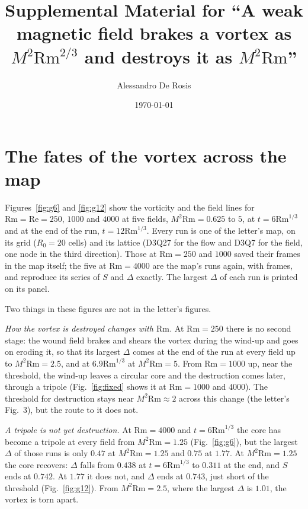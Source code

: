 \documentclass[aps,prl,onecolumn,10pt,amsmath,amssymb,superscriptaddress,floatfix]{revtex4-2}
\newcommand{\Rm}{\mathrm{Rm}}
\newcommand{\Rey}{\mathrm{Re}}
\begin{document}
\title{Supplemental Material for ``A weak magnetic field brakes a vortex as
\texorpdfstring{$M^2\Rm^{2/3}$}{M2 Rm2/3} and destroys it as
\texorpdfstring{$M^2\Rm$}{M2 Rm}''}

\author{Alessandro De Rosis}

\date{\today}
\maketitle

\section{The fates of the vortex across the map}

Figures~\ref{fig:g6} and \ref{fig:g12} show the vorticity and the field lines for
$\Rm=\Rey=250$, $1000$ and $4000$ at five fields, $M^2\Rm=0.625$ to $5$, at
$t=6\Rm^{1/3}$ and at the end of the run, $t=12\Rm^{1/3}$. Every run is one of the
letter's map, on its grid ($R_0=20$ cells) and its lattice (D3Q27 for the flow and
D3Q7 for the field, one node in the third direction). Those at $\Rm=250$ and
$1000$ saved their frames in the map itself; the five at $\Rm=4000$ are the map's
runs again, with frames, and reproduce its series of $S$ and $\Delta$ exactly.
The largest $\Delta$ of each run is printed on its panel.

Two things in these figures are not in the letter's figures.

\textit{How the vortex is destroyed changes with $\Rm$.} At $\Rm=250$ there is no
second stage: the wound field brakes and shears the vortex during the wind-up and
goes on eroding it, so that its largest $\Delta$ comes at the end of the run at every
field up to $M^2\Rm=2.5$, and at $6.9\Rm^{1/3}$ at $M^2\Rm=5$. From $\Rm=1000$ up,
near the threshold, the wind-up leaves a circular core and the destruction comes
later, through a tripole (Fig.~\ref{fig:fixed} shows it at $\Rm=1000$ and $4000$). The threshold for destruction stays near $M^2\Rm\approx2$ across this change
(the letter's Fig.~3), but the route to it does not.

\textit{A tripole is not yet destruction.} At $\Rm=4000$ and $t=6\Rm^{1/3}$ the core
has become a tripole at every field from $M^2\Rm=1.25$ (Fig.~\ref{fig:g6}), but the
largest $\Delta$ of those runs is only $0.47$ at $M^2\Rm=1.25$ and $0.75$ at $1.77$.
At $M^2\Rm=1.25$ the core recovers: $\Delta$ falls from $0.438$ at $t=6\Rm^{1/3}$ to
$0.311$ at the end, and $S$ ends at $0.742$. At $1.77$ it does not, and $\Delta$
ends at $0.743$, just short of the threshold (Fig.~\ref{fig:g12}). From
$M^2\Rm=2.5$, where the largest $\Delta$ is $1.01$, the vortex is torn apart.
\end{document}
